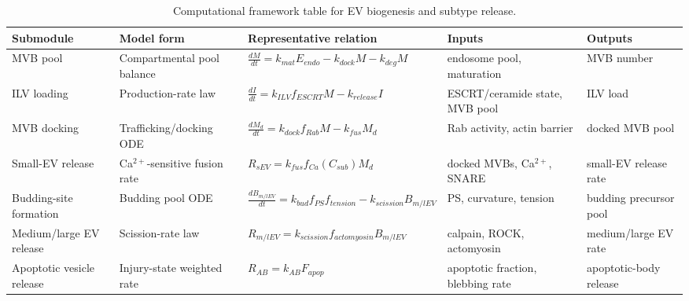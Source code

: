 \begin{table}[t]
\footnotesize\sf
\centering
\caption{Computational framework table for EV biogenesis and subtype release.\label{T_A10_comp_ev_release}}
\begin{tabular}{p{2.6cm} p{3.0cm} p{4.6cm} p{2.8cm} p{2.8cm}}
\toprule
\textbf{Submodule} & \textbf{Model form} & \textbf{Representative relation} & \textbf{Inputs} & \textbf{Outputs} \\
\midrule
MVB pool & Compartmental pool balance \cite{huotari2011endosome,ott2025coordination,borchers2023regulatory,solinger2025escrting} & $\frac{dM}{dt}=k_{mat}E_{endo}-k_{dock}M-k_{deg}M$ & endosome pool, maturation & MVB number \\
ILV loading & Production-rate law \cite{takahashi2015hrs,wollert2010molecular,pfitzner2020escrt,larios2020alix,choezom2022nsmase2,crivelli2022ceramideTransfer} & $\frac{dI}{dt}=k_{ILV}f_{ESCRT}M-k_{release}I$ & ESCRT/ceramide state, MVB pool & ILV load \\
MVB docking & Trafficking/docking ODE \cite{hsu2010rab35,messenger2018munc13,izumi2021rab27,tang2026rab27,marie2023accessory} & $\frac{dM_d}{dt}=k_{dock}f_{Rab}M-k_{fus}M_d$ & Rab activity, actin barrier & docked MVB pool \\
Small-EV release & Ca$^{2+}$-sensitive fusion rate \cite{liu2023snare,matsui2023vamp5,woo2017munc13,courtney2023synaptotagmin7} & $R_{sEV}=k_{fus}f_{Ca}(C_{sub})M_d$ & docked MVBs, Ca$^{2+}$, SNARE & small-EV release rate \\
Budding-site formation & Budding pool ODE \cite{pang2025arf,dai2019rhoa,menck2017nsmaseMicrovesicles} & $\frac{dB_{m/lEV}}{dt}=k_{bud}f_{PS}f_{tension}-k_{scission}B_{m/lEV}$ & PS, curvature, tension & budding precursor pool \\
Medium/large EV release & Scission-rate law \cite{pang2025arf,dai2019rhoa,menck2017nsmaseMicrovesicles,williams2025calpains} & $R_{m/lEV}=k_{scission}f_{actomyosin}B_{m/lEV}$ & calpain, ROCK, actomyosin & medium/large EV rate \\
Apoptotic vesicle release & Injury-state weighted rate \cite{teixeira2020rock1,ozdemir2021rock1,sakamaki2025mprip,cappe2023systematic} & $R_{AB}=k_{AB}F_{apop}$ & apoptotic fraction, blebbing rate & apoptotic-body release \\
\bottomrule
\end{tabular}
\end{table}

